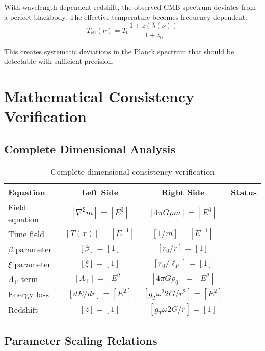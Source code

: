 \documentclass[12pt,a4paper]{article}
\newcommand{\Tfield}{T(x)}
\newcommand{\LambdaT}{\Lambda_{\text{T}}}
\begin{document}
	With wavelength-dependent redshift, the observed CMB spectrum deviates from a perfect blackbody. The effective temperature becomes frequency-dependent:
	\begin{equation}
		T_{\text{eff}}(\nu) = T_0 \frac{1+z(\lambda(\nu))}{1+z_0}
	\end{equation}
	
	This creates systematic deviations in the Planck spectrum that should be detectable with sufficient precision.
	
	\section{Mathematical Consistency Verification}
	\label{sec:consistency_verification}
	
	\subsection{Complete Dimensional Analysis}
	\label{subsec:dimensional_analysis}
	
	\begin{table}[htbp]
		\centering
		\begin{tabular}{|l|c|c|c|}
			\hline
			\textbf{Equation} & \textbf{Left Side} & \textbf{Right Side} & \textbf{Status} \\
			\hline
			Field equation & $[\nabla^2 m] = [E^3]$ & $[4\pi G \rho m] = [E^3]$ & \checkmark \\
			Time field & $[\Tfield] = [E^{-1}]$ & $[1/m] = [E^{-1}]$ & \checkmark \\
			$\beta$ parameter & $[\beta] = [1]$ & $[r_0/r] = [1]$ & \checkmark \\
			$\xi$ parameter & $[\xi] = [1]$ & $[r_0/\ell_P] = [1]$ & \checkmark \\
			$\LambdaT$ term & $[\LambdaT] = [E^2]$ & $[4\pi G \rho_0] = [E^2]$ & \checkmark \\
			Energy loss & $[dE/dr] = [E^2]$ & $[g_T \omega^2 2G/r^2] = [E^2]$ & \checkmark \\
			Redshift & $[z] = [1]$ & $[g_T \omega 2G/r] = [1]$ & \checkmark \\
			\hline
		\end{tabular}
		\caption{Complete dimensional consistency verification}
	\end{table}
	
	\subsection{Parameter Scaling Relations}
	\label{subsec:scaling_relations}
	
\end{document}

